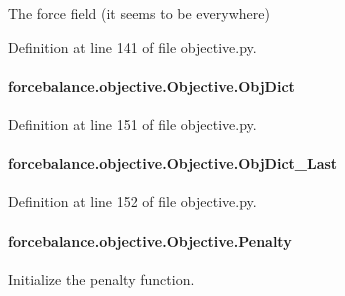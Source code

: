 The force field (it seems to be everywhere) 



Definition at line 141 of file objective.\-py.

\hypertarget{classforcebalance_1_1objective_1_1Objective_aee0b6ceda10120047e9ebe6f20c1f8a0}{
\paragraph[{Obj\-Dict}]{\setlength{\rightskip}{0pt plus 5cm}forcebalance.\-objective.\-Objective.\-Obj\-Dict}}\label{classforcebalance_1_1objective_1_1Objective_aee0b6ceda10120047e9ebe6f20c1f8a0}


Definition at line 151 of file objective.\-py.

\hypertarget{classforcebalance_1_1objective_1_1Objective_a86263748baa5017d4dc1c3a824d7382e}{
\paragraph[{Obj\-Dict\-\_\-\-Last}]{\setlength{\rightskip}{0pt plus 5cm}forcebalance.\-objective.\-Objective.\-Obj\-Dict\-\_\-\-Last}}\label{classforcebalance_1_1objective_1_1Objective_a86263748baa5017d4dc1c3a824d7382e}


Definition at line 152 of file objective.\-py.

\hypertarget{classforcebalance_1_1objective_1_1Objective_aafb2228e87f0e3647b2e4be0678d76ba}{
\paragraph[{Penalty}]{\setlength{\rightskip}{0pt plus 5cm}forcebalance.\-objective.\-Objective.\-Penalty}}\label{classforcebalance_1_1objective_1_1Objective_aafb2228e87f0e3647b2e4be0678d76ba}


Initialize the penalty function. 



